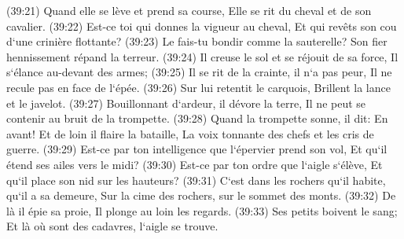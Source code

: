 \verse (39:21) Quand elle se lève et prend sa course, Elle se rit du cheval et de son cavalier. 
\verse (39:22) Est-ce toi qui donnes la vigueur au cheval, Et qui revêts son cou d`une crinière flottante? 
\verse (39:23) Le fais-tu bondir comme la sauterelle? Son fier hennissement répand la terreur. 
\verse (39:24) Il creuse le sol et se réjouit de sa force, Il s`élance au-devant des armes; 
\verse (39:25) Il se rit de la crainte, il n`a pas peur, Il ne recule pas en face de l`épée. 
\verse (39:26) Sur lui retentit le carquois, Brillent la lance et le javelot. 
\verse (39:27) Bouillonnant d`ardeur, il dévore la terre, Il ne peut se contenir au bruit de la trompette. 
\verse (39:28) Quand la trompette sonne, il dit: En avant! Et de loin il flaire la bataille, La voix tonnante des chefs et les cris de guerre. 
\verse (39:29) Est-ce par ton intelligence que l`épervier prend son vol, Et qu`il étend ses ailes vers le midi? 
\verse (39:30) Est-ce par ton ordre que l`aigle s`élève, Et qu`il place son nid sur les hauteurs? 
\verse (39:31) C`est dans les rochers qu`il habite, qu`il a sa demeure, Sur la cime des rochers, sur le sommet des monts. 
\verse (39:32) De là il épie sa proie, Il plonge au loin les regards. 
\verse (39:33) Ses petits boivent le sang; Et là où sont des cadavres, l`aigle se trouve. 

